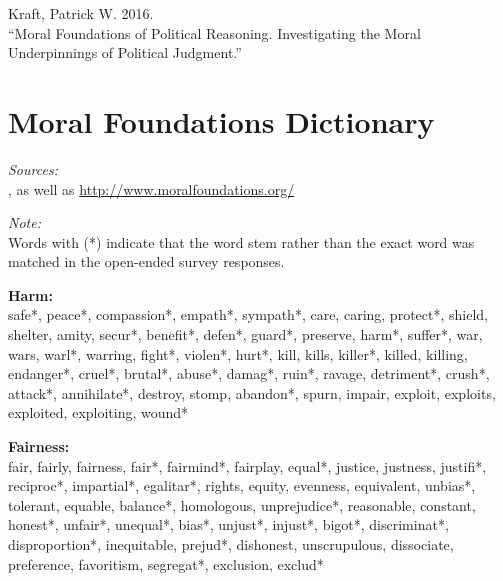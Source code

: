 \documentclass[12pt]{article}
\begin{document}
\clearpage
\footnotesize\singlespacing
\appendices
\appendixpage
\renewcommand\thesubsection{\Roman{subsection}}
\begin{flushleft}
Kraft, Patrick W. 2016.\\``Moral Foundations of Political Reasoning. Investigating the Moral Underpinnings of Political Judgment.''

\startcontents[sections]
\clearpage

\section{Moral Foundations Dictionary}\label{app:dict}
\renewcommand\thefigure{\thesection.\arabic{figure}}
\renewcommand\thetable{\thesection.\arabic{table}}
\setcounter{figure}{0}
\setcounter{table}{0}

\textit{Sources:}\\
\citet{graham2009liberals}, as well as \url{http://www.moralfoundations.org/}
\vspace{.5cm}

\textit{Note:}\\
Words with (*) indicate that the word stem rather than the exact word was matched in the open-ended survey responses.
\vspace{.5cm}

\textbf{Harm:}\\
safe*, peace*, compassion*, empath*, sympath*, care, caring, protect*, shield, shelter, amity, secur*, benefit*, defen*, guard*, preserve, harm*, suffer*, war, wars, warl*, warring, fight*, violen*, hurt*, kill, kills, killer*, killed, killing, endanger*, cruel*, brutal*, abuse*, damag*, ruin*, ravage, detriment*, crush*, attack*, annihilate*, destroy, stomp, abandon*, spurn, impair, exploit, exploits, exploited, exploiting, wound*
\vspace{.5cm}

\textbf{Fairness:}\\
fair, fairly, fairness, fair*, fairmind*, fairplay, equal*, justice, justness, justifi*, reciproc*, impartial*, egalitar*, rights, equity, evenness, equivalent, unbias*, tolerant, equable, balance*, homologous, unprejudice*, reasonable, constant, honest*, unfair*, unequal*, bias*, unjust*, injust*, bigot*, discriminat*, disproportion*, inequitable, prejud*, dishonest, unscrupulous, dissociate, preference, favoritism, segregat*, exclusion, exclud*
\vspace{.5cm}


\end{flushleft}
\end{document}
